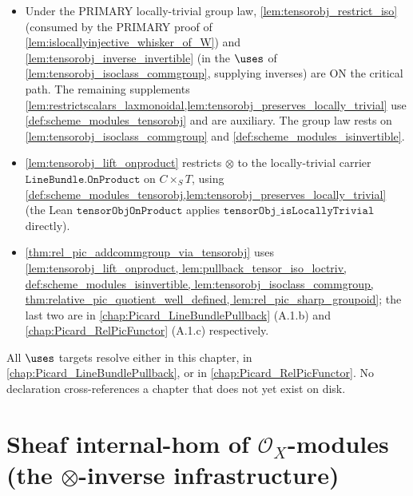 \begin{itemize}
    on top of the assembled locally-trivial associator/unitors/braiding; the
    \(\mathrm{Units}(\mathrm{Skeleton}(\Scheme.\mathtt{Modules}\,X))\) presentation
    via \texttt{jw\_ismonoidal} is retained as the route~(e) fallback.
  \item Under the PRIMARY locally-trivial group law, \cref{lem:tensorobj_restrict_iso}
    (consumed by the PRIMARY proof of \cref{lem:islocallyinjective_whisker_of_W}) and
    \cref{lem:tensorobj_inverse_invertible} (in the \(\uses\) of
    \cref{lem:tensorobj_isoclass_commgroup}, supplying inverses) are ON the critical
    path. The remaining supplements
    \cref{lem:restrictscalars_laxmonoidal,lem:tensorobj_preserves_locally_trivial}
    use \cref{def:scheme_modules_tensorobj} and are auxiliary. The group law rests on
    \cref{lem:tensorobj_isoclass_commgroup} and \cref{def:scheme_modules_isinvertible}.
  \item \cref{lem:tensorobj_lift_onproduct} restricts \(\otimes\) to the
    locally-trivial carrier \(\texttt{LineBundle.OnProduct}\) on \(C \times_S T\),
    using \cref{def:scheme_modules_tensorobj,lem:tensorobj_preserves_locally_trivial}
    (the Lean \(\mathtt{tensorObjOnProduct}\) applies
    \(\mathtt{tensorObj\_isLocallyTrivial}\) directly).
  \item \cref{thm:rel_pic_addcommgroup_via_tensorobj} uses
    \cref{lem:tensorobj_lift_onproduct,
          lem:pullback_tensor_iso_loctriv,
          def:scheme_modules_isinvertible,
          lem:tensorobj_isoclass_commgroup,
          thm:relative_pic_quotient_well_defined,
          lem:rel_pic_sharp_groupoid}; the last two are in
    \cref{chap:Picard_LineBundlePullback} (A.1.b) and
    \cref{chap:Picard_RelPicFunctor} (A.1.c) respectively.
\end{itemize}
All \(\uses\) targets resolve either in this chapter, in
\cref{chap:Picard_LineBundlePullback}, or in
\cref{chap:Picard_RelPicFunctor}. No declaration cross-references a
chapter that does not yet exist on disk.

\section{Sheaf internal-hom of \(\mathcal{O}_X\)-modules (the \(\otimes\)-inverse
  infrastructure)}
\label{sec:tensorobj_dual_infra}


